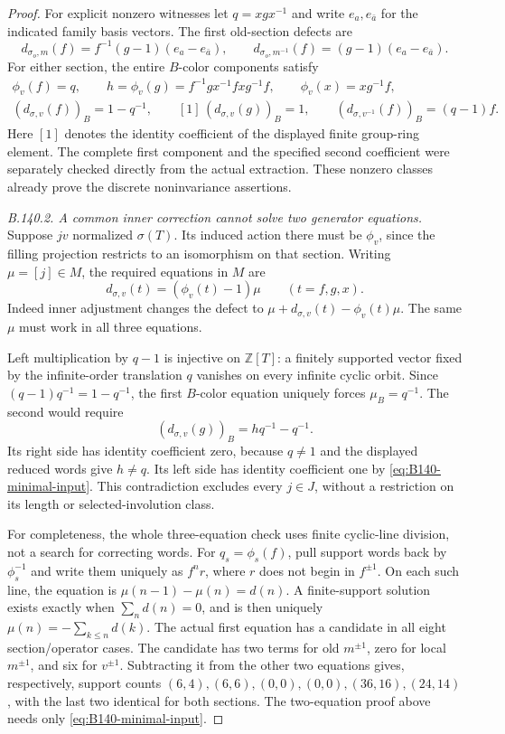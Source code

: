 \begin{proof}
For explicit nonzero witnesses let
$q=xgx^{-1}$ and write $e_a,e_{\bar a}$ for the indicated
family basis vectors. The first old-section defects are
\[
 d_{\sigma_o,m}(f)
     =f^{-1}(g-1)(e_a-e_{\bar a}),\qquad
 d_{\sigma_o,m^{-1}}(f)
     =(g-1)(e_a-e_{\bar a}).
\]
For either section, the entire $B$-color components satisfy
\begin{equation}\label{eq:B140-minimal-input}
 \begin{gathered}
 \phi_v(f)=q,\qquad
 h=\phi_v(g)=f^{-1}gx^{-1}fxg^{-1}f,\qquad
 \phi_v(x)=xg^{-1}f,\\
 (d_{\sigma,v}(f))_B=1-q^{-1},\qquad
 [1]\,(d_{\sigma,v}(g))_B=1,\qquad
 (d_{\sigma,v^{-1}}(f))_B=(q-1)f .
 \end{gathered}
\end{equation}
Here $[1]$ denotes the identity coefficient of the displayed
finite group-ring element. The complete first component and
the specified second coefficient were separately checked
directly from the actual extraction.
These nonzero classes already prove the discrete
noninvariance assertions.

\emph{B.140.2. A common inner correction cannot solve two generator equations.}
Suppose $jv$ normalized $\sigma(T)$.
Its induced action there must be $\phi_v$, since the filling
projection restricts to an isomorphism on that section.
Writing $\mu=[j]\in M$, the required equations in $M$ are
\begin{equation}\label{eq:B140-common-equations}
 d_{\sigma,v}(t)=(\phi_v(t)-1)\mu\qquad(t=f,g,x).
\end{equation}
Indeed inner adjustment changes the defect to
$\mu+d_{\sigma,v}(t)-\phi_v(t)\mu$.
The same $\mu$ must work in all three equations.

Left multiplication by $q-1$ is injective on $\mathbb Z[T]$:
a finitely supported vector fixed by the infinite-order
translation $q$ vanishes on every infinite cyclic orbit.
Since $(q-1)q^{-1}=1-q^{-1}$,
the first $B$-color equation uniquely forces
$\mu_B=q^{-1}$.
The second would require
\[
 (d_{\sigma,v}(g))_B=hq^{-1}-q^{-1}.
\]
Its right side has identity coefficient zero, because
$q\neq1$ and the displayed reduced words give $h\neq q$.
Its left side has identity coefficient one by
\eqref{eq:B140-minimal-input}. This contradiction excludes
every $j\in J$, without a restriction on its length or
selected-involution class.

For completeness, the whole three-equation check uses
finite cyclic-line division, not a search for correcting words.
For $q_s=\phi_s(f)$, pull support words back by $\phi_s^{-1}$
and write them uniquely as $f^nr$, where $r$ does not begin
in $f^{\pm1}$. On each such line, the equation is
$\mu(n-1)-\mu(n)=d(n)$.
A finite-support solution exists exactly when
$\sum_n d(n)=0$, and is then uniquely
$\mu(n)=-\sum_{k\leq n}d(k)$.
The actual first equation has a candidate in all eight
section/operator cases. The candidate has two terms for
old $m^{\pm1}$, zero for local $m^{\pm1}$, and six for
$v^{\pm1}$. Subtracting it from the other two equations
gives, respectively, support counts
$(6,4),(6,6),(0,0),(0,0),(36,16),(24,14)$,
with the last two identical for both sections.
The two-equation proof above needs only
\eqref{eq:B140-minimal-input}.


\end{proof}
